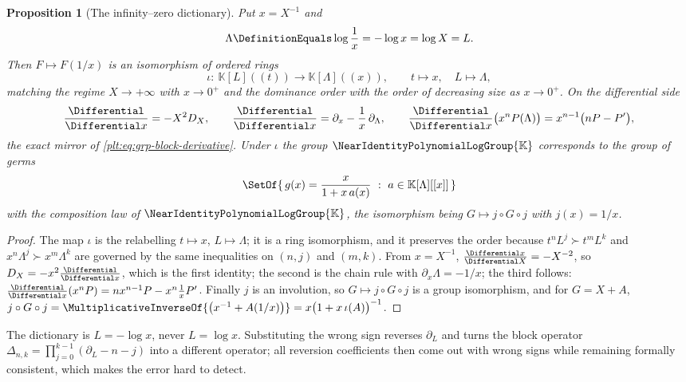 \documentclass[11pt,oneside]{article}
\theoremstyle{plain}
\newtheorem{proposition}[theorem]{Proposition}
\theoremstyle{definition}
\theoremstyle{remark}
\newcommand{\K}{\mathbb{K}}
\newcommand{\Gnear}{\NearIdentityPolynomialLogGroup{\K}} %
\newcommand{\DX}{D_{X}}                                  %
\newcommand{\shiftop}[2]{\Delta_{#1,#2}}                 %
\newcommand{\compose}{\mathbin{\circ}}
\newcommand{\succdom}{\succ}
\begin{document}
\begin{proposition}[The infinity--zero dictionary]
\label{plt:prop:grp-zero-dictionary}
Put \(x=X^{-1}\) and
\[
  \Lambda\DefinitionEquals\log\frac1x=-\log x=\log X=L .
\]
Then \(F\mapsto F(1/x)\) is an isomorphism of ordered rings
\[
  \iota:\ \K[L]((t))\longrightarrow\K[\Lambda]((x)),
  \qquad t\longmapsto x,\quad L\longmapsto\Lambda,
\]
matching the regime \(X\to+\infty\) with \(x\to0^{+}\) and the dominance order
with the order of decreasing size as \(x\to0^{+}\).  On the differential side
\begin{equation}\label{plt:eq:grp-zero-derivation}
  \frac{\Differential}{\Differential x}=-X^{2}\DX,
  \qquad
  \frac{\Differential}{\Differential x}
   =\partial_x-\frac1x\,\partial_\Lambda,
  \qquad
  \frac{\Differential}{\Differential x}\bigl(x^{n}P(\Lambda)\bigr)
   =x^{n-1}\bigl(nP-P'\bigr),
\end{equation}
the exact mirror of \eqref{plt:eq:grp-block-derivative}.  Under \(\iota\) the
group \(\Gnear\) corresponds to the group of germs
\[
  \SetOf{\,g(x)=\frac{x}{1+x\,a(x)}\ :\ a\in\K[\Lambda][[x]]\,}
\]
with the composition law of \(\Gnear\), the isomorphism being
\(G\mapsto j\compose G\compose j\) with \(j(x)=1/x\).
\end{proposition}

\begin{proof}
The map \(\iota\) is the relabelling \(t\mapsto x\), \(L\mapsto\Lambda\); it is
a ring isomorphism, and it preserves the order because
\(t^nL^j\succdom t^mL^k\) and \(x^n\Lambda^j\succdom x^m\Lambda^k\) are
governed by the same inequalities on \((n,j)\) and \((m,k)\).  From
\(x=X^{-1}\), \(\frac{\Differential x}{\Differential X}=-X^{-2}\), so
\(\DX=-x^{2}\frac{\Differential}{\Differential x}\), which is the first
identity; the second is the chain rule with \(\partial_x\Lambda=-1/x\); the
third follows:
\(\frac{\Differential}{\Differential x}(x^nP)=nx^{n-1}P-x^{n}\frac1xP'\).
Finally \(j\) is an involution, so \(G\mapsto j\compose G\compose j\) is a group
isomorphism, and for \(G=X+A\),
\(j\compose G\compose j=\MultiplicativeInverseOf{\bigl(x^{-1}+A(1/x)\bigr)}
 =x\bigl(1+x\,\iota(A)\bigr)^{-1}\).
\end{proof}

\begin{warningbox}
The dictionary is \(L=-\log x\), never \(L=\log x\).  Substituting the wrong
sign reverses \(\partial_L\) and turns the block operator
\(\shiftop{n}{k}=\prod_{j=0}^{k-1}(\partial_L-n-j)\) into a different operator;
all reversion coefficients then come out with wrong signs while remaining
formally consistent, which makes the error hard to detect.
\end{warningbox}
\end{document}
